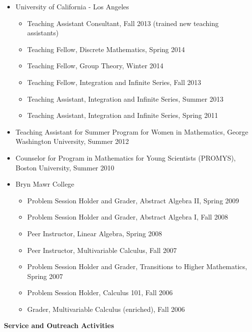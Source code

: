 \documentclass[10pt]{article}
\theoremstyle{plain} \numberwithin{equation}{section}
\theoremstyle{definition}
\begin{document}
\begin{itemize}
    \item[] University of California - Los Angeles
    	\begin{itemize}
	\item[] Teaching Assistant Consultant, Fall 2013 (trained new teaching assistants)
	\item[] Teaching Fellow, Discrete Mathematics, Spring 2014
	\item[] Teaching Fellow, Group Theory, Winter 2014
	\item[] Teaching Fellow, Integration and Infinite Series, Fall 2013
	\item[] Teaching Assistant, Integration and Infinite Series, Summer 2013
	\item[] Teaching Assistant, Integration and Infinite Series, Spring 2011
	\end{itemize}
    \item[] Teaching Assistant for Summer Program for Women in Mathematics, George Washington University, Summer 2012
    \item[] Counselor for Program in Mathematics for Young Scientists (PROMYS), Boston University, Summer 2010
    \item[] Bryn Mawr College
    	\begin{itemize}
		\item[] Problem Session Holder and Grader, Abstract Algebra II, Spring 2009
		\item[] Problem Session Holder and Grader, Abstract Algebra I, Fall 2008
		\item[] Peer Instructor, Linear Algebra, Spring 2008
		\item[] Peer Instructor, Multivariable Calculus, Fall 2007
		\item[] Problem Session Holder and Grader, Transitions to Higher Mathematics, Spring 2007
		\item[] Problem Session Holder, Calculus 101, Fall 2006
		\item[] Grader, Multivariable Calculus (enriched), Fall 2006
	\end{itemize}
\end{itemize}

\medskip

{\large\textbf{Service and Outreach Activities}} \medskip
\end{document}
